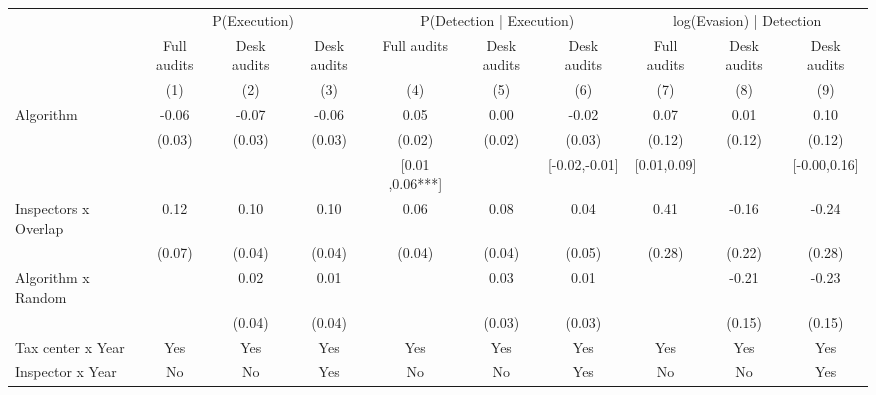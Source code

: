 \begin{tabular}{lccc|ccc|ccc} \toprule
\multicolumn{1}{l}{} & \multicolumn{3}{c}{P(Execution)} & \multicolumn{3}{c}{P(Detection | Execution)} & \multicolumn{3}{c}{log(Evasion) | Detection} \\\cmidrule(lr){2-4}\cmidrule(lr){5-7}\cmidrule(lr){8-10} \multicolumn{1}{l}{} & Full audits & Desk audits & Desk audits & Full audits & Desk audits & Desk audits & Full audits & Desk audits & Desk audits \\ \multicolumn{1}{l}{} & (1) & (2) & (3) & (4) & (5) & (6) & (7) & (8) & (9) \\ \midrule
Algorithm   &       -0.06\sym{*}  &       -0.07\sym{**} &       -0.06\sym{**} &        0.05\sym{**} &        0.00         &       -0.02         &        0.07         &        0.01         &        0.10         \\
            &      (0.03)         &      (0.03)         &      (0.03)         &      (0.02)         &      (0.02)         &      (0.03)         &      (0.12)         &      (0.12)         &      (0.12)         \\
\addlinespace
 & & & & [0.01 ,0.06***] & & [-0.02,-0.01] & [0.01,0.09] & & [-0.00,0.16] \\  Inspectors x Overlap&        0.12\sym{*}  &        0.10\sym{**} &        0.10\sym{**} &        0.06\sym{*}  &        0.08\sym{**} &        0.04         &        0.41         &       -0.16         &       -0.24         \\
            &      (0.07)         &      (0.04)         &      (0.04)         &      (0.04)         &      (0.04)         &      (0.05)         &      (0.28)         &      (0.22)         &      (0.28)         \\
\addlinespace
Algorithm x Random&                     &        0.02         &        0.01         &                     &        0.03         &        0.01         &                     &       -0.21         &       -0.23         \\
            &                     &      (0.04)         &      (0.04)         &                     &      (0.03)         &      (0.03)         &                     &      (0.15)         &      (0.15)         \\
\midrule
Tax center x Year&         Yes         &         Yes         &         Yes         &         Yes         &         Yes         &         Yes         &         Yes         &         Yes         &         Yes         \\
Inspector x Year&          No         &          No         &         Yes         &          No         &          No         &         Yes         &          No         &          No         &         Yes         \\

\end{tabular}
